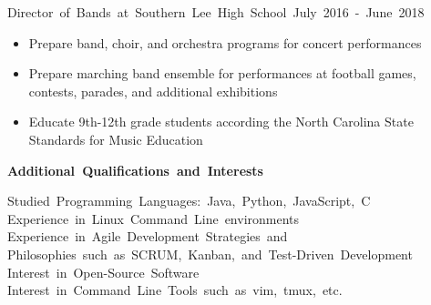 \documentclass[12pt]{letter}
\begin{document}
    \vspace{2 mm}
    \hbox{Director of Bands at Southern Lee High School \hspace{70pt}
        July 2016 - June 2018}
    \vspace{-5 mm}
    \begin{itemize}
        \itemsep 0em
        \item Prepare band, choir, and orchestra programs for concert 
            performances
        \item Prepare marching band ensemble for performances at football
            games, contests, parades, and additional exhibitions
        \item Educate 9th-12th grade students according the North Carolina
            State Standards for Music Education
    \end{itemize}

    \vspace {10 mm}
    \hbox{\textbf{\large {Additional Qualifications and Interests}}}
    \vspace{3 mm}

    \hbox{Studied Programming Languages: Java, Python, JavaScript, C}
    \hbox{Experience in Linux Command Line environments}
    \hbox{Experience in Agile Development Strategies and} 
    \hbox{Philosophies such as SCRUM, Kanban, and Test-Driven Development}
    \hbox{Interest in Open-Source Software}
    \hbox{Interest in Command Line Tools such as vim, tmux, etc.}
\end{document}

